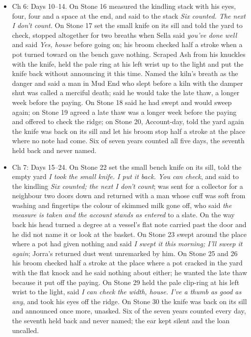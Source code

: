 \documentclass{design/chronicle}
\begin{document}
{\begin{itemize}[leftmargin=1.4em,itemsep=1pt,topsep=3pt,parsep=0pt]
\end{itemize}

\begin{itemize}[leftmargin=1.4em,itemsep=1pt,topsep=3pt,parsep=0pt]

\item Ch 6: Days 10--14. On Stone 16 measured the kindling stack with his eyes, four, four and a space at the end, and said to the stack \emph{Six counted. The next I don’t count.} On Stone 17 set the small knife on its sill and told the yard to check, stopped altogether for two breaths when Sella said \emph{you’ve done well} and said \emph{Yes, house} before going on; his broom checked half a stroke when a pot turned toward on the bench gave nothing. Scraped Ash from his knuckles with the knife, held the pale ring at his left wrist up to the light and put the knife back without announcing it this time. Named the kiln’s breath as the danger and said a man in Mud End who slept before a kiln with the damper shut was called a merciful death; said he would take the late thaw, a longer week before the paying. On Stone 18 said he had swept and would sweep again; on Stone 19 agreed a late thaw was a longer week before the paying and offered to check the ridge; on Stone 20, Account-day, told the yard again the knife was back on its sill and let his broom stop half a stroke at the place where no note had come. Six of seven years counted all five days, the seventh held back and never named.

\end{itemize}

\begin{itemize}[leftmargin=1.4em,itemsep=1pt,topsep=3pt,parsep=0pt]

\item Ch 7: Days 15--24. On Stone 22 set the small bench knife on its sill, told the empty yard \emph{I took the small knife. I put it back. You can check}, and said to the kindling \emph{Six counted; the next I don’t count}; was sent for a collector for a neighbour two doors down and returned with a man whose cuff was soft from washing and fingertips the colour of skimmed milk gone off, who said \emph{the measure is taken and the account stands as entered} to a slate. On the way back his head turned a degree at a vessel’s flat note carried past the door and he did not name it or look at the basket. On Stone 23 swept around the place where a pot had given nothing and said \emph{I swept it this morning; I’ll sweep it again}; Jorra’s returned dust went unremarked by him. On Stone 25 and 26 his broom checked half a stroke at the place where a pot cracked in the yard with the flat knock and he said nothing about either; he wanted the late thaw because it put off the paying. On Stone 29 held the pale clip-ring at his left wrist to the light, said \emph{I can check the width, house. I’ve a thumb as good as any}, and took his eyes off the ridge. On Stone 30 the knife was back on its sill and announced once more, unasked. Six of the seven years counted every day, the seventh held back and never named; the ear kept silent and the loan uncalled.


\end{itemize}}
\end{document}
